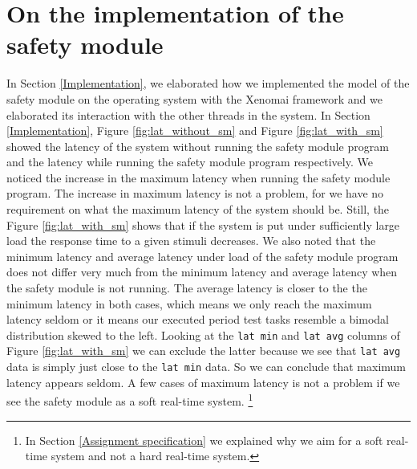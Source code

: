 \documentclass[12pt]{scrreprt}
\begin{document}
\section{On the implementation of the safety module}
\label{On the implementation of the safety module}
In Section \ref{Implementation}, we elaborated how we implemented the model of the safety module on the operating system with the Xenomai framework and we elaborated its interaction with the other threads in the system. In Section \ref{Implementation}, Figure \ref{fig:lat_without_sm} and Figure \ref{fig:lat_with_sm} showed the latency of the system without running the safety module program and the latency while running the safety module program respectively. We noticed the increase in the maximum latency when running the safety module program. The increase in maximum latency is not a problem, for we have no requirement on what the maximum latency of the system should be. Still, the Figure \ref{fig:lat_with_sm} shows that if the system is put under sufficiently large load the response time to a given stimuli decreases. We also noted that the minimum latency and average latency under load of the safety module program does not differ very much from the minimum latency and average latency when the safety module is not running. The average latency is closer to the the minimum latency in both cases, which means we only reach the maximum latency seldom or it means our executed period test tasks resemble a bimodal distribution skewed to the left. Looking at the \texttt{lat min} and \texttt{lat avg} columns of Figure \ref{fig:lat_with_sm} we can exclude the latter because we see that \texttt{lat avg} data is simply just close to the \texttt{lat min} data. So we can conclude that maximum latency appears seldom. A few cases of maximum latency is not a problem if we see the safety module as a soft real-time system. \footnote{In Section \ref{Assignment specification} we explained why we aim for a soft real-time system and not a hard real-time system.}
\par
\end{document}
